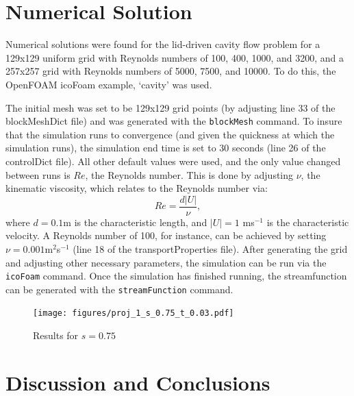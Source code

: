 \documentclass[twocolumn,10pt]{asme2ej}
\begin{document}
\section{Numerical Solution}

Numerical solutions were found for the lid-driven cavity flow problem for a 129x129 uniform grid with Reynolds numbers of 100, 400, 1000, and 3200, and a 257x257 grid with Reynolds numbers of 5000, 7500, and 10000. To do this, the OpenFOAM icoFoam example, `cavity' was used.

The initial mesh was set to be 129x129 grid points (by adjusting line 33 of the blockMeshDict file) and was generated with the \lstinline[language=sh]`blockMesh` command. To insure that the simulation runs to convergence (and given the quickness at which the simulation runs), the simulation end time is set to 30 seconds (line 26 of the controlDict file). All other default values were used, and the only value changed between runs is $Re$, the Reynolds number. This is done by adjusting $\nu$, the kinematic viscosity, which relates to the Reynolds number via:
\begin{equation}
Re = \frac{d|U|}{\nu},
\end{equation}
where $d = 0.1$m is the characteristic length, and $|U| = 1$ ms$^{-1}$ is the characteristic velocity. A Reynolds number of 100, for instance, can be achieved by setting $\nu = 0.001$m$^2$s$^{-1}$ (line 18 of the transportProperties file). After generating the grid and adjusting other necessary parameters, the simulation can be run via the \lstinline[language=sh]`icoFoam` command. Once the simulation has finished running, the streamfunction can be generated with the \lstinline[language=sh]`streamFunction` command.

\begin{figure}[htb]
\begin{center}
\texttt{[image: figures/proj\_1\_s\_0.75\_t\_0.03.pdf]}
\caption{Results for $s = 0.75$}
\end{center}
\end{figure}

\section{Discussion and Conclusions}

\nocite{*}
\hfill \break
\end{document}
